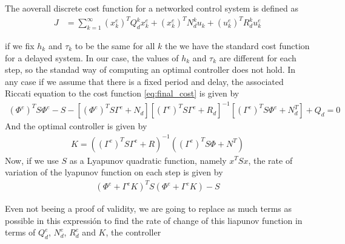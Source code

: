 \documentclass[nols]{tufte-handout}
\theoremstyle{definition}
\begin{document}
The aoverall discrete cost function for a networked control system is defined as
\begin{align}\label{eq:final_cost}
    J &=\sum_{k=1}^{\infty}(x_k^e)^TQ_d^kx_k^e+(x_k^e)^TN_d^ku_k+(u_k^e)^TR_d^ku_k^e
\end{align}

if we fix $h_k$ and $\tau_k$ to be the same for all $k$ the we have the standard cost function for a delayed system. In our case, the values of $h_k$ and $\tau_k$ are different for each step, so the standad way of computing an optimal controller does not hold. In any case if we assume that there is a fixed period and delay, the associated Riccati equation to the cost function \eqref{eq:final_cost} is given by
\begin{align}
    (\Phi^e)^TS\Phi^e-S-\left[(\Phi^e)^TS\Gamma^e+N_d\right]\left[(\Gamma^e)^TS\Gamma^e+R_d\right]^{-1}\left[(\Gamma^e)^TS\Phi^e+N_d^T\right]+Q_d=0 
\end{align}
And the optimal controller is given by
\begin{align}
    K=((\Gamma^e)^TS\Gamma^e+R)^{-1}((\Gamma^e)^TS\Phi+N^T)
\end{align}
Now, if we use $S$ as a Lyapunov quadratic function, namely $x^TSx$, the rate of variation of the lyapunov function on each step is given by
\begin{align}
    (\Phi^e+\Gamma^eK)^TS(\Phi^e+\Gamma^eK)-S
\end{align}




Even not beeing a proof of validity, we are going to replace as much terms as possible in this expressión to find the rate of change of this liapunov function in terms of $Q_d^e$, $N_d^e$, $R_d^e$ and $K$, the controller

\ifx \fillibre \undefined
\end{document}
